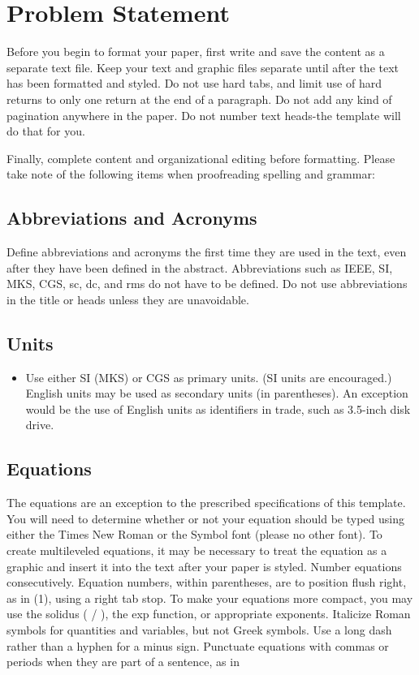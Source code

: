 \documentclass[letterpaper, 10 pt, conference]{ieeeconf}  %
\begin{document}
\section{Problem Statement}

Before you begin to format your paper, first write and save the content as a separate text file. Keep your text and graphic files separate until after the text has been formatted and styled. Do not use hard tabs, and limit use of hard returns to only one return at the end of a paragraph. Do not add any kind of pagination anywhere in the paper. Do not number text heads-the template will do that for you.

Finally, complete content and organizational editing before formatting. Please take note of the following items when proofreading spelling and grammar:

\subsection{Abbreviations and Acronyms} Define abbreviations and acronyms the first time they are used in the text, even after they have been defined in the abstract. Abbreviations such as IEEE, SI, MKS, CGS, sc, dc, and rms do not have to be defined. Do not use abbreviations in the title or heads unless they are unavoidable.

\subsection{Units}

\begin{itemize}

\item Use either SI (MKS) or CGS as primary units. (SI units are encouraged.) English units may be used as secondary units (in parentheses). An exception would be the use of English units as identifiers in trade, such as 3.5-inch disk drive.

\end{itemize}


\subsection{Equations}

The equations are an exception to the prescribed specifications of this template. You will need to determine whether or not your equation should be typed using either the Times New Roman or the Symbol font (please no other font). To create multileveled equations, it may be necessary to treat the equation as a graphic and insert it into the text after your paper is styled. Number equations consecutively. Equation numbers, within parentheses, are to position flush right, as in (1), using a right tab stop. To make your equations more compact, you may use the solidus ( / ), the exp function, or appropriate exponents. Italicize Roman symbols for quantities and variables, but not Greek symbols. Use a long dash rather than a hyphen for a minus sign. Punctuate equations with commas or periods when they are part of a sentence, as in
\end{document}
